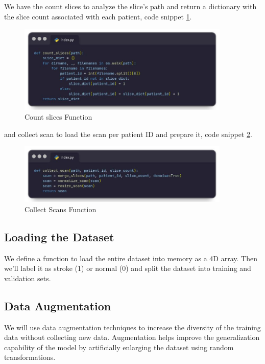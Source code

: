 We have the count slices to analyze the slice's path and return a dictionary with the slice count associated with each patient, code snippet \ref{fig:brain_count_slice}.

\begin{figure}
 \centering
    \includegraphics[width=0.90\textwidth]{Img/Chap-01/31.jpg}
    \caption{Count slices Function}
    \label{fig:brain_count_slice}
\end{figure}

and collect scan to load the scan per patient ID and prepare it, code snippet \ref{fig:brain_collect_slice}.

\begin{figure}
 \centering
    \includegraphics[width=0.90\textwidth]{Img/Chap-01/32.jpg}
    \caption{Collect Scans Function}
    \label{fig:brain_collect_slice}
\end{figure}

\subsection{Loading the Dataset}

We define a function to load the entire dataset into memory as a 4D array. Then we'll label it as stroke (1) or normal (0) and split the dataset into training and validation sets. 

\subsection{Data Augmentation}

We will use data augmentation techniques to increase the diversity of the training data without collecting new data. Augmentation helps improve the generalization capability of the model by artificially enlarging the dataset using random transformations.

